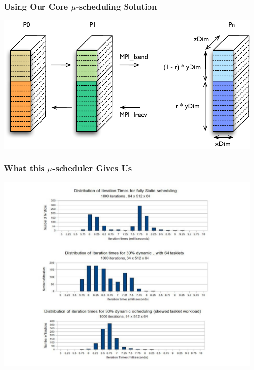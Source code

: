 \begin{frame} 
\frametitle{Using Our Core $\mu$-scheduling Solution} 
\includegraphics[width=\textwidth]{images/hybrid_decomp}
\end{frame} 

\begin{frame}
\frametitle{What this $\mu$-scheduler Gives Us} 
\includegraphics[width=\textwidth]{images/uSched-signature-graph} 
\end{frame} 


